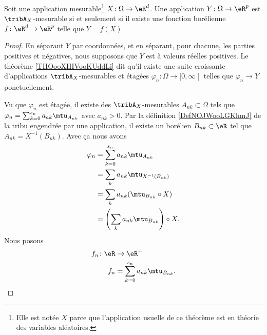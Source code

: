 \begin{theorem}     \label{ThofrestemesurablesXYYX}
	Soit une application mesurable\footnote{Elle est notée \( X\) parce que l'application usuelle de ce théorème est en théorie des variables aléatoires.} \( X\colon \Omega\to \eR^d\). Une application \( Y\colon \Omega\to \eR^{p}\) est \( \tribA_X\)-mesurable si et seulement si il existe une fonction borélienne \( f\colon \eR^d\to \eR^{p}\) telle que \( Y=f(X)\).
\end{theorem}

\begin{proof}
	En séparant \( Y\) par coordonnées, et en séparant, pour chacune, les parties positives et négatives, nous supposons que \( Y\) est à valeurs réelles positives. Le théorème \ref{THOooXHIVooKUddLi} dit qu'il existe une suite croissante d'applications \( \tribA_X\)-mesurables et étagées \( \varphi_n\colon \Omega\to \mathopen[ 0 , \infty \mathclose[\) telles que \( \varphi_n\to Y\) ponctuellement.

	Vu que \( \varphi_n\) est étagée, il existe des \( \tribA_X\)-mesurables \( A_{nk}\subset \Omega\) tels que \( \varphi_n=\sum_{k=0}^{s_n}a_{ak}\mtu_{A_{nk}}\) avec \( a_{nk}>0\).  Par la définition \ref{DefNOJWooLGKhmJ} de la tribu engendrée par une application, il existe un borélien \( B_{nk}\subset \eR\) tel que \( A_{nk}=X^{-1}(B_{nk})\). Avec ça nous avons
	\begin{subequations}
		\begin{align}
			\varphi_n & =\sum_{k=0}^{s_n}a_{nk}\mtu_{A_{nk}}              \\
			          & =\sum_ka_{nk}\mtu_{X^{-1}(B_{nk})}                \\
			          & =\sum_ka_{nk}(\mtu_{B_{nk}}\circ X)               \\
			          & =\left( \sum_ka_{nk}\mtu_{B_{nk}} \right)\circ X.
		\end{align}
	\end{subequations}
	Nous posons
	\begin{equation}
		\begin{aligned}
			f_n\colon \eR & \to \eR^+                             \\
			f_n           & =\sum_{k=0}^{s_n}a_{nk}\mtu_{B_{nk}}.
		\end{aligned}
	\end{equation}


\end{proof}
